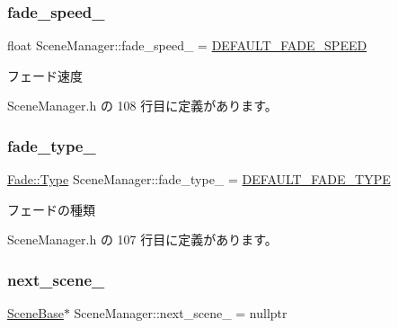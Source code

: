 \subsubsection{\texorpdfstring{fade\+\_\+speed\+\_\+}{fade\_speed\_}}
{\footnotesize\ttfamily float Scene\+Manager\+::fade\+\_\+speed\+\_\+ = \mbox{\hyperlink{class_scene_manager_a58cd446096f95d3e62e7eba16a4096ee}{D\+E\+F\+A\+U\+L\+T\+\_\+\+F\+A\+D\+E\+\_\+\+S\+P\+E\+ED}}\hspace{0.3cm}{\ttfamily [private]}}



フェード速度 



 Scene\+Manager.\+h の 108 行目に定義があります。

\mbox{\label{class_scene_manager_af8e268f4b8f39deb1c23b52c22375d8f}} 
\subsubsection{\texorpdfstring{fade\+\_\+type\+\_\+}{fade\_type\_}}
{\footnotesize\ttfamily \mbox{\hyperlink{class_fade_ac06f27215b454aa05b93c236476d6e80}{Fade\+::\+Type}} Scene\+Manager\+::fade\+\_\+type\+\_\+ = \mbox{\hyperlink{class_scene_manager_ab87f30ef7e11305bb4e3400b41225c22}{D\+E\+F\+A\+U\+L\+T\+\_\+\+F\+A\+D\+E\+\_\+\+T\+Y\+PE}}\hspace{0.3cm}{\ttfamily [private]}}



フェードの種類 



 Scene\+Manager.\+h の 107 行目に定義があります。

\mbox{\label{class_scene_manager_a7f9bb649125a114715b07154ac3df6ae}} 
\subsubsection{\texorpdfstring{next\+\_\+scene\+\_\+}{next\_scene\_}}
{\footnotesize\ttfamily \mbox{\hyperlink{class_scene_base}{Scene\+Base}}$\ast$ Scene\+Manager\+::next\+\_\+scene\+\_\+ = nullptr\hspace{0.3cm}{\ttfamily [private]}}



